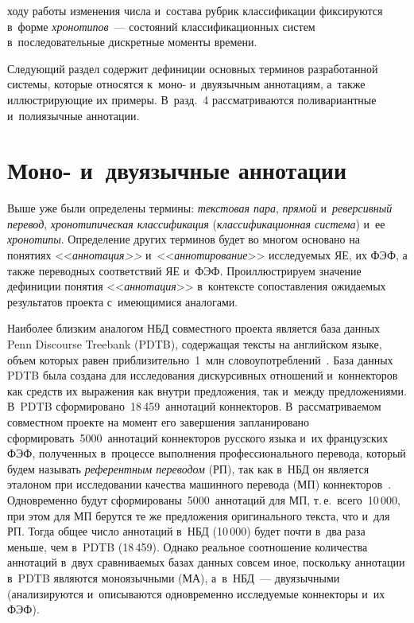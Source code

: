                     \begin{multicols}{2} 
    
     
              
\noindent
ходу работы 
изменения числа и~состава рубрик классификации фиксируются в~форме 
\textit{хронотипов}~--- состояний классификационных систем 
в~последовательные дискретные моменты времени.
    
   Следующий раздел содержит дефиниции основных терминов разработанной 
системы, которые относятся к~моно- и~двуязычным аннотациям, а~так\-же 
иллюстрирующие их примеры. В~разд.~4 рассматриваются 
поливариантные и~полиязычные аннотации.

\vspace*{-9pt}

\section{Моно- и~двуязычные аннотации}
    
   Выше уже были определены термины: \textit{текстовая пара}, 
\textit{прямой} и~\textit{реверсивный перевод}, \textit{хронотипическая 
классификация} (\textit{классификационная система}) и~ее \textit{хронотипы}. 
Определение других терминов будет во многом основано на понятиях 
<<\textit{аннотация>>} и~<<\textit{аннотирование}>> исследуемых 
ЯЕ, их ФЭФ, а также переводных соответствий ЯЕ и~ФЭФ. 
Проиллюстрируем значение дефиниции понятия <<\textit{аннотация}>> 
в~контексте сопоставления ожидаемых результатов проекта с~имеющимися 
аналогами. 
   
   Наиболее близким аналогом НБД совместного проекта является база данных 
Penn Discourse Treebank (PDTB), содержащая тексты на английском языке, 
объем которых равен приблизительно~1~млн 
словоупотреблений~\cite{11-zat}.  База данных PDTB была создана для исследования 
дискурсивных отношений и~коннекторов как средств их выражения как внутри 
предложения, так и~между предложениями. В~PDTB 
сформировано~18\,459~аннотаций коннекторов. В~рас\-смат\-ри\-ва\-емом 
совместном проекте на момент его завершения запланировано 
сформировать~5000~аннотаций коннекторов русского языка и~их французских 
ФЭФ, полученных в~процессе выполнения профессионального перевода, 
который будем называть \textit{референтным переводом} (РП), так как в~НБД 
он является эталоном при исследовании качества машинного перевода (МП) 
коннекторов~\cite{12-zat, 13-zat}. Одновременно будут 
сформированы~5000~аннотаций для МП, т.\,е.\ всего~10\,000, 
при этом для МП берутся те же предложения 
оригинального текста, что и~для РП. Тогда общее число аннотаций в~НБД 
(10\,000) будет почти в~два раза меньше, чем в~PDTB (18\,459). Однако реальное 
соотношение количества аннотаций в~двух сравниваемых базах данных совсем 
иное, поскольку аннотации в~PDTB являются моноязычными (МА), а~в~НБД~--- 
двуязычными (анализируются и~описываются одновременно исследуемые 
коннекторы и~их ФЭФ).
   

\end{multicols}
